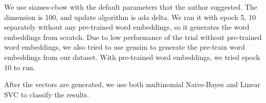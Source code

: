 We use siames-cbow with the default parameters that the author suggested. 
The dimension is 100, and update algorithm is ada delta. 
We ran it with epoch 5, 10 separately without any pre-trained word embeddings, so it generates the word embeddings from scratch.
Due to low performance of the trial without pre-trained word embeddings, we also tried to use gensim to generate the pre-train word embeddings from our dataset.
With pre-trained word embeddings, we tried epoch 10 to run.

After the vectors are generated, we use both multinomial Naive-Bayes and Linear SVC to classify the results.
